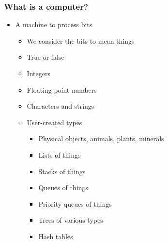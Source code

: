 \documentclass{beamer}
\begin{document}
\begin{frame}
    \frametitle{What is a computer?}
    \begin{itemize}
        \item A machine to process bits
        \begin{itemize}
            \item We consider the bits to mean things
            \item True or false
            \item Integers
            \item Floating point numbers
            \item Characters and strings
            \item User-created types
            \begin{itemize}
                \item Physical objects, animals, plants, minerals
                \item Lists of things
                \item Stacks of things
                \item Queues of things
                \item Priority queues of things
                \item Trees of various types
                \item Hash tables
            \end{itemize}
        \end{itemize}
    \end{itemize}
\end{frame}
\end{document}
